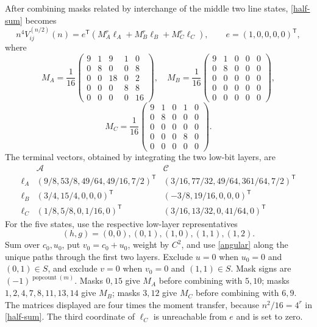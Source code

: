\documentclass[11pt]{article}
\begin{document}
After combining masks related by interchange of the middle two line states,
\eqref{half-sum} becomes
\begin{equation}
 n^4V^{(n/2)}_{ij}(n)=e^\mathsf T
 (M_A^r\ell_A+M_B^r\ell_B+M_C^r\ell_C),\qquad e=(1,0,0,0,0)^\mathsf T,\label{small-transfer}
\end{equation}
where
\[
 M_A=\frac1{16}\begin{pmatrix}9&1&9&1&0\\0&8&0&0&8\\0&0&18&0&2\\0&0&0&8&8\\0&0&0&0&16\end{pmatrix},\quad
 M_B=\frac1{16}\begin{pmatrix}9&1&0&0&0\\0&8&0&0&0\\0&0&0&0&0\\0&0&0&0&0\\0&0&0&0&0\end{pmatrix},
\]
\[
 M_C=\frac1{16}\begin{pmatrix}9&1&0&1&0\\0&8&0&0&0\\0&0&0&0&0\\0&0&0&8&0\\0&0&0&0&0\end{pmatrix}.
\]
The terminal vectors, obtained by integrating the two low-bit layers, are
{\small
\begin{equation}
\begin{array}{c|cc}
 &\mathcal A&\mathcal C\\\hline
 \ell_A&(9/8,53/8,49/64,49/16,7/2)^\mathsf T
        &(3/16,77/32,49/64,361/64,7/2)^\mathsf T\\
 \ell_B&(3/4,15/4,0,0,0)^\mathsf T
        &(-3/8,19/16,0,0,0)^\mathsf T\\
 \ell_C&(1/8,5/8,0,1/16,0)^\mathsf T
        &(3/16,13/32,0,41/64,0)^\mathsf T
\end{array}\label{terminals}
\end{equation}
}
For the five states, use the respective low-layer representatives
\[ (h,g)=(0,0),(0,1),(1,0),(1,1),(1,2). \]
Sum over $c_0,u_0$,
put $v_0=c_0+u_0$, weight by $C^2$, and use \eqref{angular} along the unique
paths through the first two layers. Exclude $u=0$ when $u_0=0$ and
$(0,1)\in S$, and exclude $v=0$ when $v_0=0$ and $(1,1)\in S$.
Mask signs are $(-1)^{\operatorname{popcount}(m)}$.
Masks $0,15$ give $M_A$ before combining with $5,10$; masks
$1,2,4,7,8,11,13,14$ give $M_B$; masks $3,12$ give $M_C$ before combining
with $6,9$. The matrices displayed are four times the moment transfer,
because $n^2/16=4^r$ in \eqref{half-sum}.
The third coordinate of $\ell_C$ is unreachable from $e$ and is set to zero.
\end{document}
